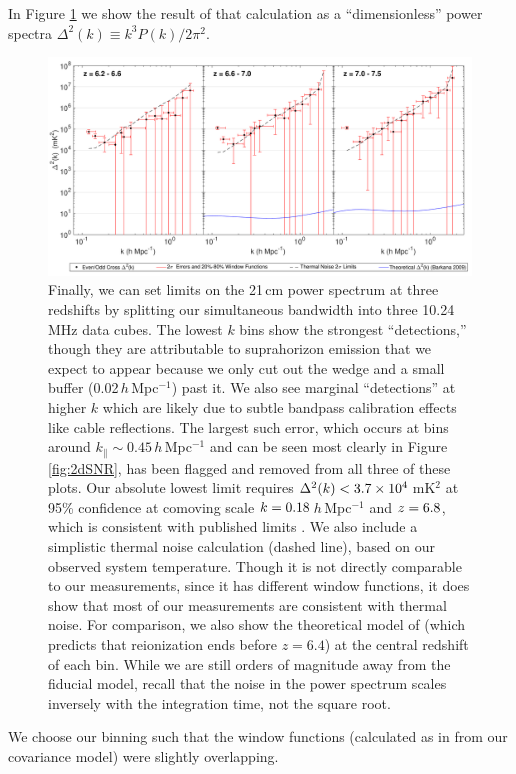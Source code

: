 In Figure \ref{fig:1dDeltaSq} we show the result of that calculation as a ``dimensionless'' power spectra $\Delta^2(k) \equiv k^3 P(k) /2\pi^2$.
\begin{figure}[] 
	\centering 
	\includegraphics[width=1\textwidth]{chap4_empirical_covariance/1dDeltaSqMultiRedshift.pdf}
	\caption[Limits on the 21\,cm power spectrum at three redshifts.]{Finally, we can set limits on the 21\,cm power spectrum at three redshifts by splitting our simultaneous bandwidth into three 10.24\,MHz data cubes. The lowest $k$ bins show the strongest ``detections,'' though they are attributable to suprahorizon emission \citep{pober13} that we expect to appear because we only cut out the wedge and a small buffer (0.02\,$h$\,Mpc$^{-1}$) past it. We also see marginal ``detections'' at higher $k$ which are likely due to subtle bandpass calibration effects like cable reflections. The largest such error, which occurs at bins around $k_\| \sim 0.45$\,$h$\,Mpc$^{-1}$ and can be seen most clearly in Figure \ref{fig:2dSNR}, has been flagged and removed from all three of these plots. Our absolute lowest limit requires $\Delta^2(k) < 3.7\times 10^4$\,mK$^2$ at 95\% confidence at comoving scale $k = 0.18$\,$h$\,Mpc$^{-1}$ and $z = 6.8$, which is consistent with published limits \cite{gmrtsignalloss,X13,parsons14,DannyMultiRedshift,ali15}. We also include a simplistic thermal noise calculation (dashed line), based on our observed system temperature. Though it is not directly comparable to our measurements, since it has different window functions, it does show that most of our measurements are consistent with thermal noise. For comparison, we also show the theoretical model of \citet{BarkanaPS2009} (which predicts that reionization ends before $z=6.4$) at the central redshift of each bin. While we are still orders of magnitude away from the fiducial model, recall that the noise in the power spectrum scales inversely with the integration time, not the square root.}
	\label{fig:1dDeltaSq}
\end{figure}
We choose our binning such that the window functions (calculated as in \citet{X13} from our covariance model) were slightly overlapping. 

